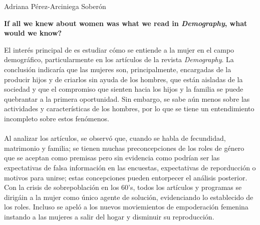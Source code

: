 \documentclass[11pt,spanish,letterpaper]{article}
\theoremstyle{plain}
\begin{document}
\begin{flushleft}
Adriana P\'erez-Arciniega Sober\'on
\end{flushleft}
\begin{center}
\textbf{If all we knew about women was what we read in \textit{Demography}, what would we know?}
\end{center}
El inter\'es principal de \cite{watkins1993if} es estudiar c\'omo se entiende a la mujer en el campo demogr\'afico, particularmente en los art\'iculos de la revista \textit{Demography}. La conclusi\'on indicar\'ia que las mujeres son, principalmente, encargadas de la producir hijos y de criarlos sin ayuda de los hombres, que est\'an aisladas de la sociedad y que el compromiso que sienten hacia los hijos y la familia se puede quebrantar a la primera oportunidad. Sin embargo, se sabe a\'un menos sobre las actividades y caracter\'isticas de los hombres, por lo que se tiene un entendimiento incompleto sobre estos fen\'omenos.\\
\\
Al analizar los art\'iculos, se observ\'o que, cuando se habla de fecundidad, matrimonio y familia; se tienen muchas preconcepciones de los roles de g\'enero que se aceptan como premisas pero sin evidencia como podr\'ian ser las expectativas de falsa informaci\'on en las encuestas, expectativas de reporducci\'on o motivos para unirse; estas concepciones pueden entorpecer el an\'alisis posterior. Con la crisis de sobrepoblaci\'on en los 60's, todos los art\'iculos y programas se dirig\'ain a la mujer como \'unico agente de soluci\'on, evidenciando lo establecido de los roles. Incluso se apel\'o a los nuevos moviemientos de empoderaci\'on femenina instando a las mujeres a salir del hogar y disminuir su reproducci\'on.\\
\\
\end{document}
